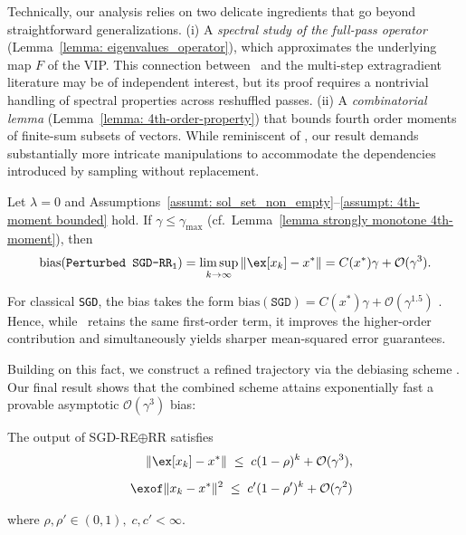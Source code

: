 Technically, our analysis relies on two delicate ingredients that go beyond straightforward generalizations.  
(i) A \emph{spectral study of the full-pass operator} (Lemma~\ref{lemma: eigenvalues_operator}), which approximates the underlying map $F$ of the VIP.  
This connection between \RRresh\ and the multi-step extragradient literature may be of independent interest, but its proof requires a nontrivial handling of spectral properties across reshuffled passes.  
(ii) A \emph{combinatorial lemma} (Lemma~\ref{lemma: 4th-order-property}) that bounds fourth order moments of finite-sum subsets of vectors.  
While reminiscent of \citet[ Lemma~1, Sec.~7]{mishchenko2020revisiting}, our result demands substantially more intricate manipulations to accommodate the dependencies introduced by sampling without replacement.
\begin{lemma}\label{lem: rr_1}
Let $\lambda=0$ and Assumptions~\ref{assumt: sol_set_non_empty}--\ref{assumpt: 4th-moment bounded} hold.  
If $\gamma\le\gamma_{\max}$ (cf.\  Lemma~\ref{lemma strongly monotone 4th-moment}), then
\[
\mathrm{bias}(\texttt{Perturbed SGD-\RRresh})
=\limsup_{k\to\infty}\|\ex[x_k]-x^*\|
= C(x^*)\gamma+\mathcal{O}(\gamma^3).
\]
\end{lemma}

\begin{draftremark}
For classical \texttt{SGD}, the bias takes the form 
$\mathrm{bias}(\texttt{SGD})=C(x^*)\gamma+\mathcal{O}(\gamma^{1.5})$ \citep{dieuleveut2020bridging}.  
Hence, while \RRresh\ retains the same first-order term, it improves the higher-order contribution and simultaneously yields sharper mean-squared error guarantees.
\end{draftremark}

Building on this fact, we construct a refined trajectory via the debiasing scheme \RRrom.  
Our final result shows that the combined scheme attains exponentially fast a provable asymptotic $\mathcal{O}(\gamma^3)$ bias:

\begin{theorem}\label{thm: rr_1_rr_2}
The output of SGD-{RE$\oplus$RR} satisfies
\begin{eqnarray}
&& \|\ex[x_k]-x^*\|\;\le\;c(1-\rho)^k+\mathcal{O}(\gamma^3), \nonumber\\[0.5em]
&& \Expe{\|x_k - x^*\|^2} \;\leq\; c'(1-\rho')^k + \mathcal{O}(\gamma^2) \nonumber
\end{eqnarray}

where $\rho, \rho'\in(0,1),\;c, c'<\infty .$
\end{theorem}

